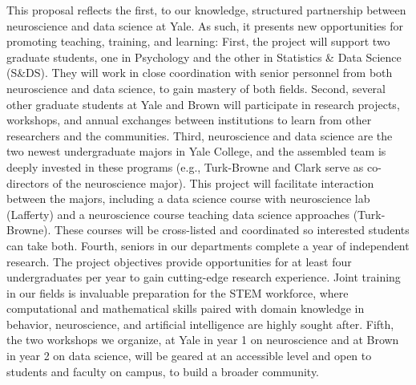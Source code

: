 
This proposal reflects the first, to our knowledge, structured
partnership between neuroscience and data science at Yale. As such, it
presents new opportunities for promoting teaching, training, and
learning: First, the project will support two graduate students, one in
Psychology and the other in Statistics \& Data Science (S\&DS). They will
work in close coordination with senior personnel from both neuroscience
and data science, to gain mastery of both fields. Second, several other
graduate students at Yale and Brown will participate in research
projects, workshops, and annual exchanges between institutions to learn
from other researchers and the communities. Third, neuroscience and data
science are the two newest undergraduate majors in Yale College, and the
assembled team is deeply invested in these programs (e.g., Turk-Browne
and Clark serve as co-directors of the neuroscience major). This project
will facilitate interaction between the majors, including a data science
course with neuroscience lab (Lafferty) and a neuroscience course
teaching data science approaches (Turk-Browne). These courses will be
cross-listed and coordinated so interested students can take both.
Fourth, seniors in our departments complete a year of independent
research. The project objectives provide opportunities for at least four
undergraduates per year to gain cutting-edge research experience. Joint
training in our fields is invaluable preparation for the STEM workforce,
where computational and mathematical skills paired with domain knowledge
in behavior, neuroscience, and artificial intelligence are highly sought
after. Fifth, the two workshops we organize, at Yale in year 1 on
neuroscience and at Brown in year 2 on data science, will be geared at
an accessible level and open to students and faculty on campus, to build
a broader community.

